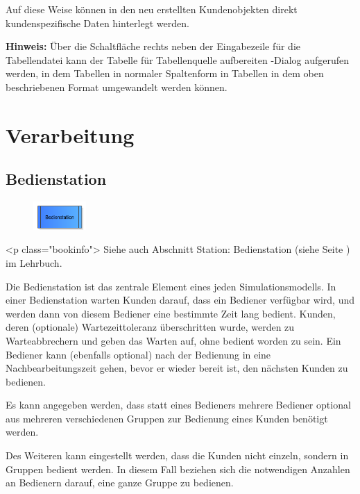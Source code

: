 Auf diese Weise können in den neu erstellten Kundenobjekten direkt kundenspezifische Daten
hinterlegt werden. 

\textbf{Hinweis:}
Über die Schaltfläche rechts neben der Eingabezeile für die Tabellendatei kann der
Tabelle für Tabellenquelle aufbereiten -Dialog
aufgerufen werden, in dem Tabellen in normaler Spaltenform in Tabellen in dem oben
beschriebenen Format umgewandelt werden können.





\chapter{Verarbeitung}

\section{Bedienstation}
\label{ref:ModelElementProcess}

\begin{figure}
\vspace{-22pt}
\includegraphics[width=2cm]{imageModelElementProcess.png}
\vspace{-22pt}
\end{figure}

<p class="bookinfo">
Siehe auch Abschnitt Station: Bedienstation (siehe Seite \pageref{ref:book:5.3.3}) im Lehrbuch.

Die Bedienstation ist das zentrale Element eines jeden Simulationsmodells. In einer Bedienstation warten Kunden darauf,
dass ein Bediener verfügbar wird, und werden dann von diesem Bediener eine bestimmte Zeit lang bedient. Kunden, deren
(optionale) Wartezeittoleranz überschritten wurde, werden zu Warteabbrechern und geben das Warten auf, ohne bedient
worden zu sein. Ein Bediener kann (ebenfalls optional) nach der Bedienung in eine Nachbearbeitungszeit gehen, bevor
er wieder bereit ist, den nächsten Kunden zu bedienen.

Es kann angegeben werden, dass statt eines Bedieners mehrere Bediener optional aus mehreren verschiedenen Gruppen zur Bedienung
eines Kunden benötigt werden.

Des Weiteren kann eingestellt werden, dass die Kunden nicht einzeln, sondern in Gruppen bedient werden. In diesem Fall
beziehen sich die notwendigen Anzahlen an Bedienern darauf, eine ganze Gruppe zu bedienen.

